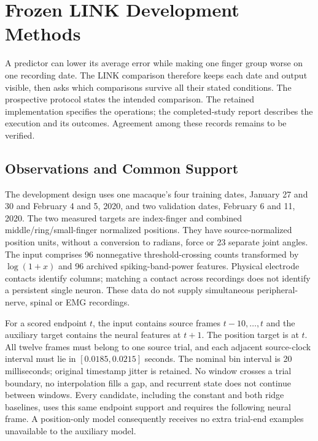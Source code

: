 \section{Frozen LINK Development Methods}

A predictor can lower its average error while making one finger group worse on
one recording date. The LINK comparison therefore keeps each date and output
visible, then asks which comparisons survive all their stated conditions.
The prospective protocol states the intended comparison. The retained
implementation specifies the operations; the completed-study report describes
the execution and its outcomes. Agreement among these records remains to be verified.

\subsection{Observations and Common Support}

The development design uses one macaque's four training dates, January 27 and 30
and February 4 and 5, 2020, and two validation dates, February 6 and 11, 2020.
The two measured targets are index-finger and combined middle/ring/small-finger
normalized positions. They have source-normalized position units, without a
conversion to radians, force or 23 separate joint angles. The input comprises
96 nonnegative threshold-crossing counts transformed by $\log(1+x)$ and 96
archived spiking-band-power features. Physical electrode contacts identify
columns; matching a contact across recordings does not identify a persistent
single neuron. These data do not supply simultaneous peripheral-nerve, spinal
or EMG recordings.

For a scored endpoint $t$, the input contains source frames $t-10,\ldots,t$ and
the auxiliary target contains the neural features at $t+1$. The position target
is at $t$. All twelve frames must belong to one source trial, and each adjacent
source-clock interval must lie in $[0.0185,0.0215]$ seconds. The nominal bin
interval is 20 milliseconds; original timestamp jitter is retained. No window
crosses a trial boundary, no interpolation fills a gap, and recurrent state
does not continue between windows. Every candidate, including the constant
and both ridge baselines, uses this same endpoint support and requires the
following neural frame. A position-only model consequently receives no extra
trial-end examples unavailable to the auxiliary model.


